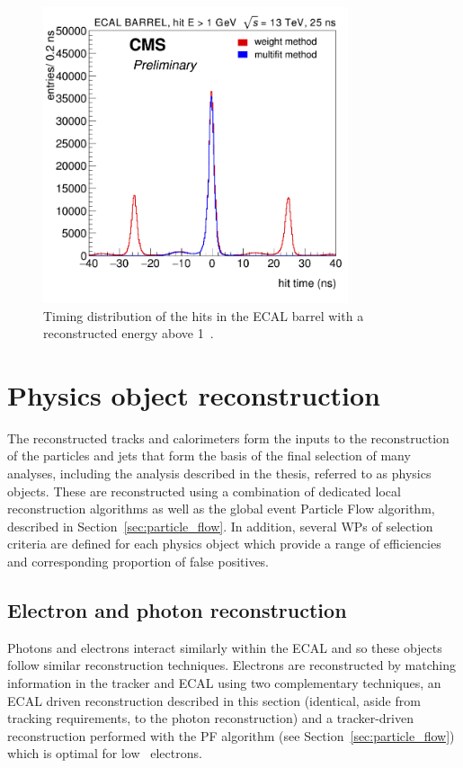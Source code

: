 \begin{figure}
\centering
    \includegraphics[width=0.8\textwidth]{./Figures/reconstruction/timing_barrel_linear.png}
  \caption{Timing distribution of the hits in the ECAL barrel with a reconstructed energy above 1\GeV~\cite{ecal_timing}.}
  \label{fig:timing_barrel_linear}
\end{figure}

\section{Physics object reconstruction}

The reconstructed tracks and calorimeters form the inputs to the reconstruction of the particles and 
jets that form the basis of the final selection of many analyses, including the analysis described 
in the thesis, referred to as physics objects. These are reconstructed using a combination of
dedicated local reconstruction algorithms as well as the global event Particle
Flow algorithm, described in Section~\ref{sec:particle_flow}.
In addition, several WPs of selection criteria are defined for each physics object 
which provide a range of efficiencies and corresponding proportion of false positives. 

\subsection{Electron and photon reconstruction}

Photons and electrons interact similarly within the ECAL and so these objects 
follow similar reconstruction techniques. Electrons are reconstructed by matching 
information in the tracker and ECAL using two complementary techniques, an ECAL driven 
reconstruction described in this section (identical, aside from tracking
requirements, to the photon reconstruction) and a tracker-driven reconstruction performed with
the PF algorithm (see Section~\ref{sec:particle_flow}) which is optimal for low \pt~electrons. 


